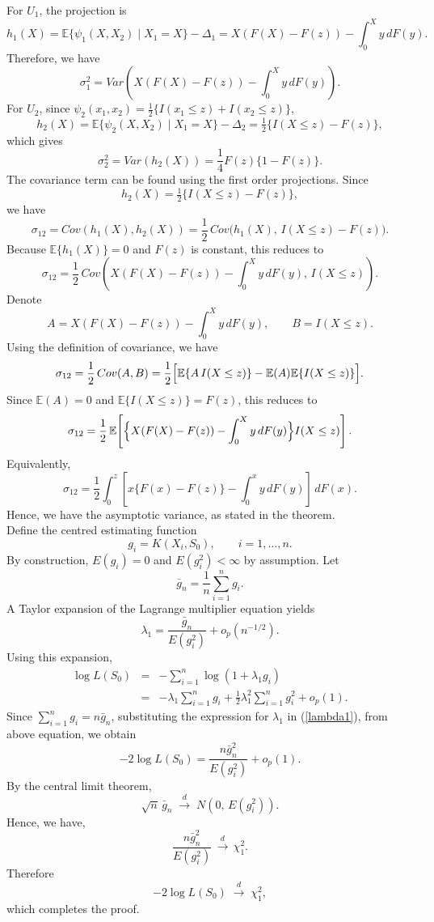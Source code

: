 \documentclass[11pt]{article}
\begin{document}
For $U_1$, the projection is
$$h_1(X)
=
\mathbb E\{\psi_1(X,X_2)\mid X_1=X\}-\Delta_1
=
X(F(X)-F(z))-\int_0^X y\,dF(y).$$
Therefore, we have
$$\sigma_1^2=Var\left(
X(F(X)-F(z))-\int_0^X y\,dF(y)
\right).$$
For $U_2$, since $\psi_2(x_1,x_2)=\tfrac12\{I(x_1\le z)+I(x_2\le z)\}$,
$$
h_2(X)
=
\mathbb E\{\psi_2(X,X_2)\mid X_1=X\}-\Delta_2
=
\tfrac12\{I(X\le z)-F(z)\},
$$
which gives
$$\sigma_2^2
=
Var(h_2(X))
=
\frac14 F(z)\{1-F(z)\}.$$
The covariance term can be found using the first order projections.
Since
$$h_2(X)=\tfrac12\{I(X\le z)-F(z)\},$$we have
$$
\sigma_{12}
=
Cov(h_1(X),h_2(X))
=
\frac12\,Cov\!\bigl(h_1(X),\,I(X\le z)-F(z)\bigr).
$$
Because $\mathbb E\{h_1(X)\}=0$ and $F(z)$ is constant, this reduces to
$$
\sigma_{12}
=
\frac12\,Cov\!\left(
X(F(X)-F(z))-\int_0^X y\,dF(y),
\, I(X\le z)
\right).
$$
Denote
$$
A=X(F(X)-F(z))-\int_0^X y\,dF(y),
\qquad
B=I(X\le z).
$$
Using the definition of covariance, we have
$$
\sigma_{12}
=
\frac12\,Cov(A,B)
=
\frac12\Bigl[
\mathbb E\{A\,I(X\le z)\}
-
\mathbb E(A)\mathbb E\{I(X\le z)\}
\Bigr].
$$
Since $\mathbb E(A)=0$ and $\mathbb E\{I(X\le z)\}=F(z)$, this reduces to
$$
\sigma_{12}
=
\frac12\,\mathbb E\!\left[
\Bigl\{X(F(X)-F(z))-\int_0^X y\,dF(y)\Bigr\}
I(X\le z)
\right].
$$
Equivalently,
$$
\sigma_{12}
=
\frac12
\int_0^z
\left[
x\{F(x)-F(z)\}
-
\int_0^x y\,dF(y)
\right]
\,dF(x).
$$
Hence, we have the asymptotic variance, as stated in the theorem. \\


  Define the centred estimating function
$$
g_i = K(X_i,S_0),
\qquad i=1,\dots,n.
$$
By construction, $E(g_i)=0$ and $E(g_i^2)<\infty$ by assumption.
Let$$
\bar{g}_n = \frac{1}{n}\sum_{i=1}^n g_i.
$$
A Taylor expansion of the Lagrange multiplier equation yields
\begin{equation}\label{lambda1}
  \lambda_1=\frac{\bar{g}_n}{E(g_i^2)} + o_p(n^{-1/2}).
\end{equation}Using this expansion,
\begin{eqnarray*}
    \log L(S_0)&=&-\sum_{i=1}^{n} \log\left(1+\lambda_1 g_i\right)\\
    &=&-\lambda_1 \sum_{i=1}^{n} g_i + \frac{1}{2}\lambda_1^2 \sum_{i=1}^n g_i^2 + o_p(1).
\end{eqnarray*}
Since $\sum_{i=1}^n g_i = n\bar{g}_n$, substituting the expression for  $\lambda_1$ in (\ref{lambda1}), from above equation, we obtain
$$
-2\log L(S_0)=\frac{n\bar{g}_n^2}{E(g_i^2)} + o_p(1).
$$
By the central limit theorem,
$$
\sqrt{n}\,\bar{g}_n
\;\xrightarrow{d}\;
N(0,\,E(g_i^2)).
$$
Hence, we have,
$$
\frac{n\bar{g}_n^2}{E(g_i^2)}
\,\xrightarrow{d}\,
\chi^2_1.
$$
Therefore $$-2\log L(S_0)
\;\xrightarrow{d}\;
\chi^2_1,$$
which completes the proof.
\end{document}
